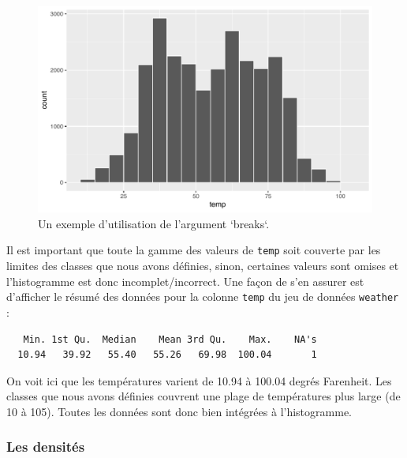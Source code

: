 \documentclass[a4paperpaper,]{article}
\newenvironment{Shaded}{\begin{snugshade}}{\end{snugshade}}
\newcommand{\KeywordTok}[1]{\textcolor[rgb]{0.12,0.11,0.11}{\textbf{#1}}}
\newcommand{\NormalTok}[1]{\textcolor[rgb]{0.12,0.11,0.11}{#1}}
\newcommand{\OperatorTok}[1]{\textcolor[rgb]{0.12,0.11,0.11}{#1}}
\begin{document}
\begin{figure}[htpb]

{\centering \includegraphics[width=0.9\linewidth]{figure/break-1} 

}

\caption{Un exemple d'utilisation de l'argument `breaks`.}\label{fig:break}
\end{figure}

Il est important que toute la gamme des valeurs de \texttt{temp} soit couverte par les limites des classes que nous avons définies, sinon, certaines valeurs sont omises et l'histogramme est donc incomplet/incorrect. Une façon de s'en assurer est d'afficher le résumé des données pour la colonne \texttt{temp} du jeu de données \texttt{weather} :

\begin{Shaded}
\end{Shaded}

\begin{verbatim}
   Min. 1st Qu.  Median    Mean 3rd Qu.    Max.    NA's 
  10.94   39.92   55.40   55.26   69.98  100.04       1 
\end{verbatim}

On voit ici que les températures varient de 10.94 à 100.04 degrés Farenheit. Les classes que nous avons définies couvrent une plage de températures plus large (de 10 à 105). Toutes les données sont donc bien intégrées à l'histogramme.

\hypertarget{les-densites}{%
\subsubsection{Les densités}\label{les-densites}}
\end{document}
